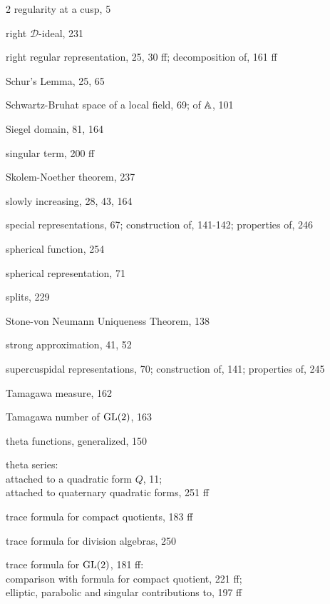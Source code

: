 \begin{multicols}{2}
\noindent regularity at a cusp, 5\par
\noindent right $\mathcal{D}$-ideal, 231\par
\noindent right regular representation, 25, 30 ff; decomposition of, 161 ff\par
\noindent Schur's Lemma, 25, 65\par
\noindent Schwartz-Bruhat space of a local field, 69; of $\mathbb{A}$, 101\par
\noindent Siegel domain, 81, 164\par
\noindent singular term, 200 ff\par
\noindent Skolem-Noether theorem, 237\par
\noindent slowly increasing, 28, 43, 164\par
\noindent special representations, 67; construction of, 141-142; properties of, 246\par
\noindent spherical function, 254\par
\noindent spherical representation, 71\par
\noindent splits, 229\par
\noindent Stone-von Neumann Uniqueness Theorem, 138\par
\noindent strong approximation, 41, 52\par
\noindent supercuspidal representations, 70; construction of, 141; properties of, 245\par
\noindent Tamagawa measure, 162\par
\noindent Tamagawa number of $\operatorname{GL}(2)$, 163\par
\noindent theta functions, generalized, 150\par
\noindent theta series:\\
\hspace*{1em}attached to a quadratic form $Q$, 11;\\
\hspace*{1em}attached to quaternary quadratic forms, 251 ff\par
\noindent trace formula for compact quotients, 183 ff\par
\noindent trace formula for division algebras, 250\par
\noindent trace formula for $\operatorname{GL}(2)$, 181 ff:\\
\hspace*{1em}comparison with formula for compact quotient, 221 ff;\\
\hspace*{1em}elliptic, parabolic and singular contributions to, 197 ff\par

\end{multicols}
